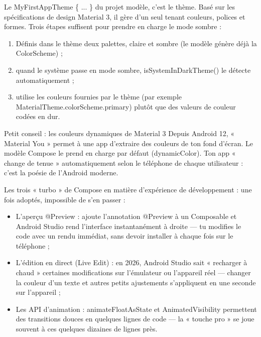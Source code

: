 
Le MyFirstAppTheme \{ ... \} du projet modèle, c'est le thème. Basé sur les spécifications de design Material 3, il gère d'un seul tenant couleurs, polices et formes. Trois étapes suffisent pour prendre en charge le mode sombre :

\begin{enumerate}
  \item Définis dans le thème deux palettes, claire et sombre (le modèle génère déjà la ColorScheme) ;
  \item quand le système passe en mode sombre, isSystemInDarkTheme() le détecte automatiquement ;
  \item utilise les couleurs fournies par le thème (par exemple MaterialTheme.colorScheme.primary) plutôt que des valeurs de couleur codées en dur.
\end{enumerate}

\begin{tcbinfo}{Petit conseil : les couleurs dynamiques de Material 3}
Depuis Android 12, « Material You » permet à une app d'extraire des couleurs de ton fond d'écran. Le modèle Compose le prend en charge par défaut (dynamicColor). Ton app « change de tenue » automatiquement selon le téléphone de chaque utilisateur : c'est la poésie de l'Android moderne.

\end{tcbinfo}


Les trois « turbo » de Compose en matière d'expérience de développement : une fois adoptés, impossible de s'en passer :

\begin{itemize}
  \item L'aperçu @Preview : ajoute l'annotation @Preview à un Composable et Android Studio rend l'interface instantanément à droite — tu modifies le code avec un rendu immédiat, sans devoir installer à chaque fois sur le téléphone ;
  \item L'édition en direct (Live Edit) : en 2026, Android Studio sait « recharger à chaud » certaines modifications sur l'émulateur ou l'appareil réel — changer la couleur d'un texte et autres petits ajustements s'appliquent en une seconde sur l'appareil ;
  \item Les API d'animation : animateFloatAsState et AnimatedVisibility permettent des transitions douces en quelques lignes de code — la « touche pro » se joue souvent à ces quelques dizaines de lignes près.
\end{itemize}

